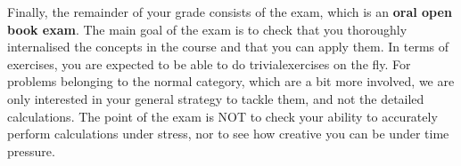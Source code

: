 Finally, the remainder of your grade consists of the exam, which is an \textbf{oral open book exam}. The main goal of the exam is to check that you thoroughly internalised the concepts in the course and that you can apply them. In terms of exercises, you are expected to be able to do trivial\iconoffset\trivial exercises on the fly. For problems belonging to the normal \iconoffset\normal category, which are a bit more involved, we are only interested in your general strategy to tackle them, and not the detailed calculations. The point of the exam is NOT to check your ability to accurately perform calculations under stress, nor to see how creative you can be under time pressure. 

